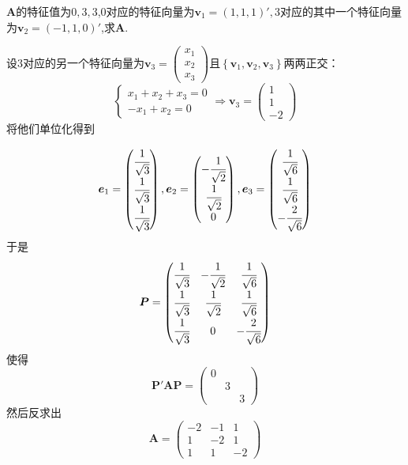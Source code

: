 \begin{brown}
    \begin{example}
        $\bm{A}$的特征值为$0,3,3$,$0$对应的特征向量为$\bm{v}_1=\left(1,1,1\right)',3$对应的其中一个特征向量为$\bm{v}_2=\left(-1,1,0\right)'$,求$\bm{A}$.
    \end{example}
    \begin{solution}
        设$3$对应的另一个特征向量为$\bm{v}_3=\begin{pmatrix}
            x_1\\x_2\\x_3
        \end{pmatrix}$且$\left\{
            \bm{v}_1,\bm{v}_2,\bm{v}_3
        \right\}$两两正交：\[
        \begin{cases*}
            x_1+x_2+x_3=0\\
            -x_1+x_2=0
        \end{cases*}\Longrightarrow\bm{v}_3=\begin{pmatrix}
            1\\1\\-2
        \end{pmatrix}
        \]将他们单位化得到
        
        \begin{align*}
            \bm{e}_1=\begin{pmatrix}
                \cfrac{1}{\sqrt{3}}\\\cfrac{1}{\sqrt{3}}\\\cfrac{1}{\sqrt{3}}
            \end{pmatrix},\bm{e}_2=\begin{pmatrix}
                -\cfrac{1}{\sqrt{2}}\\\cfrac{1}{\sqrt{2}}\\0
            \end{pmatrix},\bm{e}_3=\begin{pmatrix}
                \cfrac{1}{\sqrt{6}}\\\cfrac{1}{\sqrt{6}}\\-\cfrac{2}{\sqrt{6}}
            \end{pmatrix}
        \end{align*}于是\[
        \bm{P}=\begin{pmatrix}
            \cfrac{1}{\sqrt{3}}&-\cfrac{1}{\sqrt{2}}&\cfrac{1}{\sqrt{6}}\\
            \cfrac{1}{\sqrt{3}}&\cfrac{1}{\sqrt{2}}&\cfrac{1}{\sqrt{6}}\\
            \cfrac{1}{\sqrt{3}}&0&-\cfrac{2}{\sqrt{6}}  
        \end{pmatrix}
        \]使得\[
        \bm{P}'\bm{AP}=\begin{pmatrix}
            0&&\\
            &3&\\
            &&3
        \end{pmatrix}
        \]然后反求出\[
        \bm{A}=\begin{pmatrix}
            -2&-1&1\\
            1&-2&1\\
            1&1&-2  
        \end{pmatrix}
        \]
    \end{solution}
\end{brown}
